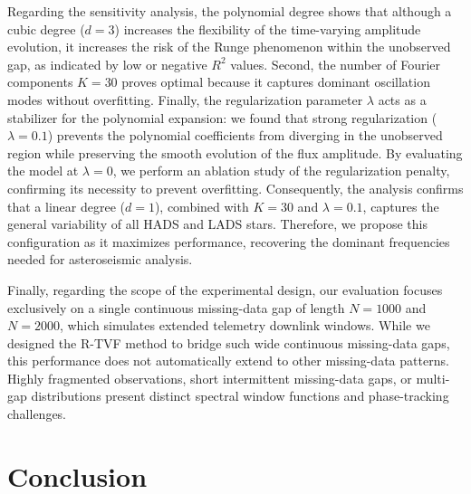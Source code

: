 \documentclass[a4paper,fleqn]{cas-sc}
\begin{document}
Regarding the sensitivity analysis, the polynomial degree shows that although a cubic degree ($d=3$) increases the flexibility of the time-varying amplitude evolution, it increases the risk of the Runge phenomenon within the unobserved gap, as indicated by low or negative $R^2$ values. Second, the number of Fourier components $K=30$ proves optimal because it captures dominant oscillation modes without overfitting. Finally, the regularization parameter $\lambda$ acts as a stabilizer for the polynomial expansion: we found that strong regularization ($\lambda=0.1$) prevents the polynomial coefficients from diverging in the unobserved region while preserving the smooth evolution of the flux amplitude. By evaluating the model at $\lambda=0$, we perform an ablation study of the regularization penalty, confirming its necessity to prevent overfitting. Consequently, the analysis confirms that a linear degree ($d=1$), combined with $K=30$ and $\lambda=0.1$, captures the general variability of all HADS and LADS stars. Therefore, we propose this configuration as it maximizes performance, recovering the dominant frequencies needed for asteroseismic analysis.

{\color{blue}Finally, regarding the scope of the experimental design, our evaluation focuses exclusively on a single continuous missing-data gap of length $N=1000$ and $N=2000$, which simulates extended telemetry downlink windows. While we designed the R-TVF method to bridge such wide continuous missing-data gaps, this performance does not automatically extend to other missing-data patterns. Highly fragmented observations, short intermittent missing-data gaps, or multi-gap distributions present distinct spectral window functions and phase-tracking challenges.}



\section{Conclusion} \label{sec:conclusion}
\end{document}
